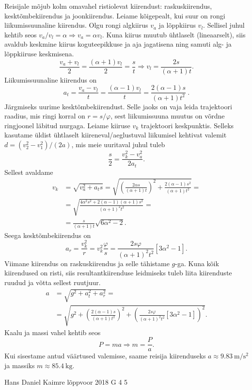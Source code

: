 \documentclass[11pt]{article}
\begin{document}
{{\ifSolution
Reisijale mõjub kolm omavahel ristiolevat kiirendust: raskuskiirendus, kesktõmbekiirendus ja joonkiirendus. Leiame kõigepealt, kui suur on rongi liikumissuunaline kiirendus. Olgu rongi algkiirus $v_a$ ja lõppkiirus $v_l$. Sellisel juhul kehtib seos $v_a/v_l=\alpha \Rightarrow v_a = \alpha v_l$. Kuna kiirus muutub ühtlaselt (lineaarselt), siis avaldub keskmine kiirus koguteepikkuse ja aja jagatisena ning samuti alg- ja lõppkiiruse keskmisena.
\[ \frac{v_a + v_l}{2} = \frac{(\alpha + 1) v_l}{2} = \frac{s}{t} \Rightarrow v_l = \frac{2s}{(\alpha + 1)t}. \]
Liikumissuunaline kiirendus on
\[ a_t = \frac{v_a-v_l}{t} = \frac{(\alpha - 1) v_l}{t} = \frac{2(\alpha - 1)s}{(\alpha + 1)t^2} \ . \]
Järgmiseks uurime kesktõmbekiirendust. Selle jaoks on vaja leida trajektoori raadius, mis ringi korral on $r = s/\varphi$, sest liikumissuuna muutus on võrdne ringjoonel läbitud nurgaga. Leiame kiiruse $v_k$ trajektoori keskpunktis. Selleks kasutame üldist ühtlaselt kiireneval/aeglustuval liikumisel kehtivat valemit $d=(v_2^2-v_1^2)/(2a)$, mis meie uuritaval juhul tuleb
\[\frac{s}{2} = \frac{v_k^2 - v_a^2}{2a_t}.\]
Sellest avaldame
\begin{align*}
v_k &= \sqrt{v_a^2+a_t s} = \sqrt{\left(\frac{2\alpha s}{(\alpha+1)t}\right)^2 +\frac{2(\alpha - 1)s^2}{(\alpha+1)t^2}} =\\
&=\sqrt{\frac{4\alpha^2 s^2 + 2(\alpha-1)(\alpha+1)s^2}{(\alpha+1)^2 t^2}} =\\
&=\frac{s}{(\alpha+1)t} \sqrt{6\alpha^2-2}.
\end{align*}
Seega kesktõmbekiirendus on
\[ a_r = \frac{v_k^2}{r} = v_k^2 \frac{\varphi}{s} = \frac{2s\varphi}{(\alpha+1)^2t^2} [3\alpha^2-1]. \]
Viimane kiirendus on raskuskiirendus ja selle tähistame $g$-ga. Kuna kõik kiirendused on risti, siis resultantkiirenduse leidmiseks tuleb liita kiirenduste ruudud ja võtta sellest ruutjuur.
\begin{align*}
a &= \sqrt{ g^2 + a_t^2 + a_r^2 } =\\
&= \sqrt{ g^2 + \left(\frac{2(\alpha - 1)s}{(\alpha + 1)t^2}\right)^2 + \left(\frac{2s\varphi}{(\alpha+1)^2t^2} [3\alpha^2-1]\right)^2 }.
\end{align*}
Kaalu ja massi vahel kehtib seos
\[ P = ma \Rightarrow m = \frac{P}{a}. \]
Kui sisestame antud väärtused valemisse, saame reisija kiirenduseks $a\approx\SI{9.83}{\meter\per\second\squared}$ ja massiks $m\approx\SI{85.4}{\kilogram}$.
\fi
}

{Hans Daniel Kaimre} %
{lõppvoor} %
{2018} %
{G 4} %
{5} %
{

}}
\end{document}
